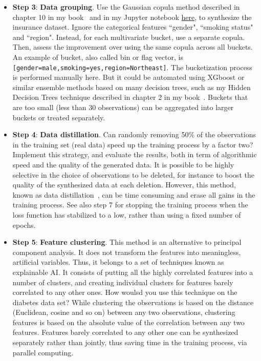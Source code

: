 \documentclass[oneside,10pt]{book}
\begin{document}
\begin{itemize}
\item[] {\bf Step 3}: {\bf Data grouping}. Use the Gaussian copula method described in chapter 10 in my book~\cite{vgelsevier} and in my Jupyter notebook
 \href{https://github.com/VincentGranville/Notebooks/blob/main/copula_insurance_nogroup.ipynb}{here}, to synthesize the insurance dataset.
  Ignore the categorical features ``gender", ``smoking status" and ``region".  Instead, for each multivariate bucket, use a separate copula. 
Then, assess the improvement over using the same copula across all buckets. An example of bucket, also called 
 bin or \textcolor{index}{flag vector}, is \texttt{[gender=male,smoking=yes,region=Northeast]}. The 
 \textcolor{index}{bucketization} process is performed manually here. But it could be automated using \textcolor{index}{XGboost} or similar 
\textcolor{index}{ensemble methods} based on many decision trees, such as my Hidden Decision Trees technique
 described in chapter 2 in my book~\cite{vgelsevier}. Buckets that are too small (less than 30 observations) can be aggregated into larger buckets or treated separately.
\vspace{1ex}

\item[] {\bf Step 4}: {\bf Data distillation}. Can randomly removing 50\% of the observations in the training set (real data) speed up the training process by a factor two? Implement this strategy, and evaluate the results, both in term of algorithmic speed and the quality of the generated data. It is possible to be highly selective in the choice of observations to be deleted, for instance to boost the quality of the synthesized data at each deletion. However, this method, known as \textcolor{index}{data distillation}~\cite{ieeedistil}, can be time consuming and erase all gains in the training process. See also step 7 for stopping the training process when the loss function has stabilized to a low, rather than using a fixed number of epochs. \vspace{1ex}

\item[] {\bf Step 5}: {\bf Feature clustering}. This method is an alternative to principal component analysis. It does not 
 transform the features into meaningless, artificial variables. Thus, 
 it belongs to a set of techniques known as \textcolor{index}{explainable AI}. It consists of putting all the highly correlated features into a number of clusters, and creating individual clusters for features barely correlated to any other ones. How woulsd you use
 this technique on the diabetes data set? While clustering the observations is based on the distance (Euclidean, cosine and so on) between any two observations, clustering features is based on the absolute value of the correlation between any two features.
 Features barely correlated to any other one can be synthesized separately rather than jointly, thus saving time in the training process, via \textcolor{index}{parallel computing}. \vspace{1ex}


\end{itemize}
\end{document}
